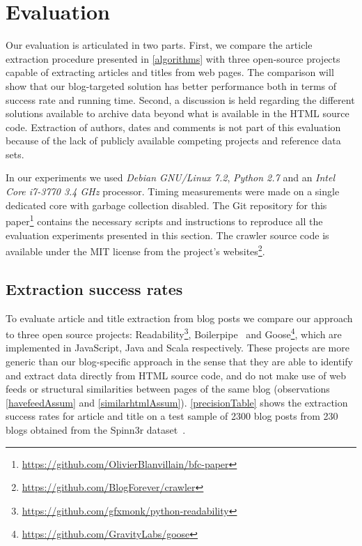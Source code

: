 \section{Evaluation}
\label{evaluation}

Our evaluation is articulated in two parts. First, we compare the article extraction procedure presented in \autoref{algorithms} with three open-source projects capable of extracting articles and titles from web pages. The comparison will show that our blog-targeted solution has better performance both in terms of success rate and running time. Second, a discussion is held regarding the different solutions available to archive data beyond what is available in the HTML source code. Extraction of authors, dates and comments is not part of this evaluation because of the lack of publicly available competing projects and reference data sets.

In our experiments we used \emph{Debian GNU/Linux 7.2}, \emph{Python 2.7} and an \emph{Intel Core i7-3770 3.4 GHz} processor. Timing measurements were made on a single dedicated core with garbage collection disabled. The Git repository for this paper\footnote{\url{https://github.com/OlivierBlanvillain/bfc-paper}} contains the necessary scripts and instructions to reproduce all the evaluation experiments presented in this section. The crawler source code is available under the MIT license from the project's websites\footnote{\url{https://github.com/BlogForever/crawler}}.


\subsection{Extraction success rates}
To evaluate article and title extraction from blog posts we compare our approach to three open source projects: Readability\footnote{\url{https://github.com/gfxmonk/python-readability}}, Boilerpipe~\cite{kohlschuetter2010} and Goose\footnote{\url{https://github.com/GravityLabs/goose}}, which are implemented in JavaScript, Java and Scala respectively. These projects are more generic than our blog-specific approach in the sense that they are able to identify and extract data directly from HTML source code, and do not make use of web feeds or structural similarities between pages of the same blog (observations \ref{havefeedAssum} and \ref{similarhtmlAssum}). \autoref{precisionTable} shows the extraction success rates for article and title on a test sample of 2300 blog posts from 230 blogs obtained from the Spinn3r dataset~\cite{burton2011}.

